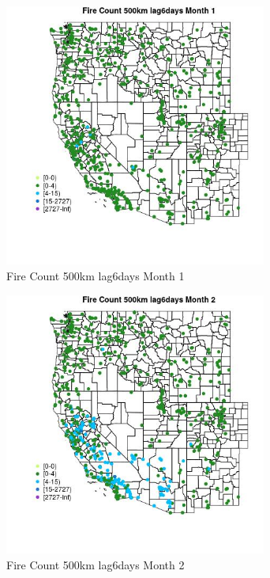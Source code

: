 \begin{figure} 
\centering  
\includegraphics[width=0.77\textwidth]{Code_Outputs/Report_ML_input_PM25_Step4_part_f_de_duplicated_aveswNAs_MapObsMo1Fire_Count_500km_lag6days.jpg} 
\caption{\label{fig:Report_ML_input_PM25_Step4_part_f_de_duplicated_aveswNAsMapObsMo1Fire_Count_500km_lag6days}Fire Count 500km lag6days Month 1} 
\end{figure} 
 

\begin{figure} 
\centering  
\includegraphics[width=0.77\textwidth]{Code_Outputs/Report_ML_input_PM25_Step4_part_f_de_duplicated_aveswNAs_MapObsMo2Fire_Count_500km_lag6days.jpg} 
\caption{\label{fig:Report_ML_input_PM25_Step4_part_f_de_duplicated_aveswNAsMapObsMo2Fire_Count_500km_lag6days}Fire Count 500km lag6days Month 2} 
\end{figure} 
 

